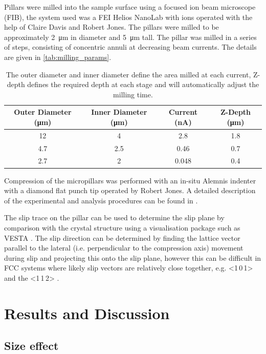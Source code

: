 Pillars were milled into the sample surface using a focused ion beam microscope (FIB), the system used was a FEI Helios NanoLab with  ions operated with the help of Claire Davis and Robert Jones. The pillars were milled to be approximately \SI{2}{\micro\meter} in diameter and \SI{5}{\micro\meter} tall. The pillar was milled in a series of steps, consisting of concentric annuli at decreasing beam currents. The details are given in \autoref{tab:milling_params}.

\begin{table}[h!]
\centering
\begin{tabular}{ |c | c | c | c|}
\hline
Outer Diameter (\si{\micro\meter}) & Inner Diameter (\si{\micro\meter}) & Current (\si{\nano\ampere}) & Z-Depth (\si{\micro\meter}) \\
\hline
  12 \rule{0pt}{2.5ex} & 4 & 2.8 & 1.8  \\
  4.7 & 2.5 & 0.46 & 0.7 \\
  2.7 & 2 & 0.048 & 0.4 \\
  \hline
\end{tabular}
\caption{The outer diameter and inner diameter define the area milled at each current, Z-depth defines the required depth at each stage and will automatically adjust the milling time.\label{tab:milling_params}}
\end{table}


Compression of the micropillars was performed with an in-situ Alemnis indenter with a diamond flat punch tip operated by Robert Jones. A detailed description of the experimental and analysis procedures can be found in \cite{Davis2015}.

The slip trace on the pillar can be used to determine the slip plane by comparison with the crystal structure using a visualisation package such as VESTA \cite{Momma2011,Davis2015}. The slip direction can be determined by finding the lattice vector parallel to the lateral (i.e. perpendicular to the compression axis) movement during slip and projecting this onto the slip plane, however this can be difficult in FCC systems where likely slip vectors are relatively close together, e.g. <1\,0\,1> and the <1\,1\,2> \cite{Davis2015}.


\section{Results and Discussion}


\subsection{Size effect}


